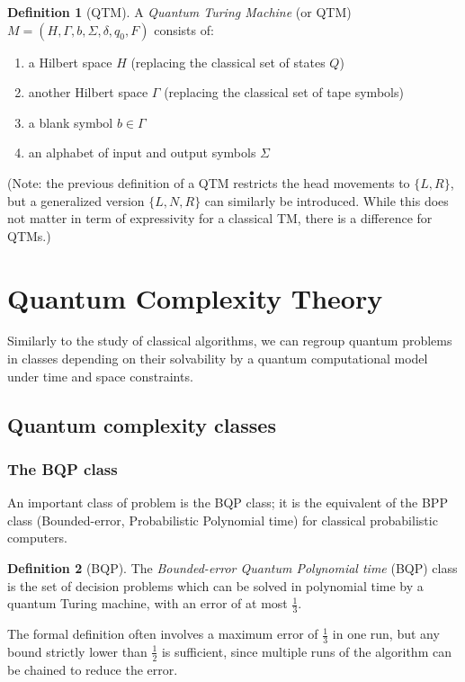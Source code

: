 \documentclass[12pt,a4paper]{article}
\theoremstyle{definition}
\newtheorem*{definition}{Definition}
\begin{document}
\begin{definition}[QTM] A \emph{Quantum Turing Machine} (or QTM) $M = (H, \Gamma, b, \Sigma, \delta, q_0, F)$ consists of:
\begin{enumerate}[label=--, noitemsep]
    \item a Hilbert space $H$ (replacing the classical set of states $Q$)
    \item another Hilbert space $\Gamma$ (replacing the classical set of tape symbols)
    \item a blank symbol $b\in \Gamma$
    \item an alphabet of input and output symbols $\Sigma$
\end{enumerate}
    
(Note: the previous definition of a QTM restricts the head movements to $\{L, R\}$, but a generalized version $\{L, N, R\}$ can similarly be introduced. While this does not matter in term of expressivity for a classical TM, there is a difference for QTMs.)

\end{definition}

\section{Quantum Complexity Theory}
Similarly to the study of classical algorithms, we can regroup quantum problems in classes depending on their solvability by a quantum computational model under time and space constraints. 

\subsection{Quantum complexity classes}
\subsubsection{The BQP class}
An important class of problem is the BQP class; it is the equivalent of the BPP class (Bounded-error, Probabilistic Polynomial time) for classical probabilistic computers.

\begin{definition}[BQP] 
    The \emph{Bounded-error Quantum Polynomial time} (BQP) class is the set of decision problems which can be solved in polynomial time by a quantum Turing machine, with an error of at most $\frac{1}{3}$. 
\end{definition}
The formal definition often involves a maximum error of $\frac{1}{3}$ in one run, but any bound strictly lower than $\frac{1}{2}$ is sufficient, since multiple runs of the algorithm can be chained to reduce the error.
\end{document}
